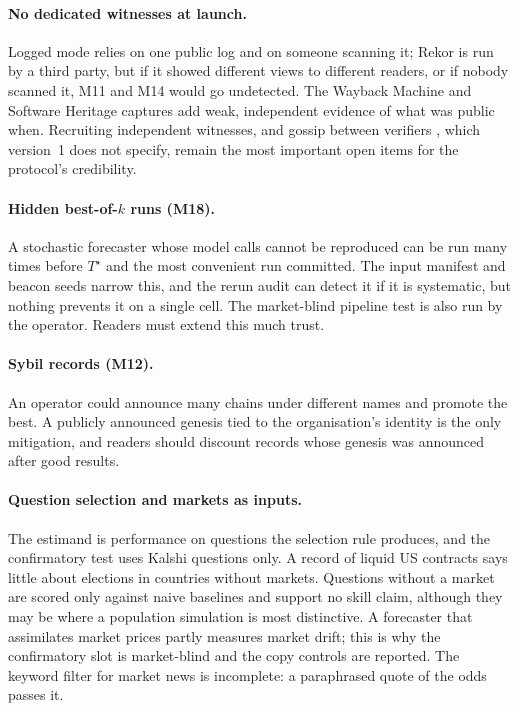 \documentclass[11pt]{article}
\newcommand{\Ts}{T^{\star}}
\begin{document}
\paragraph{No dedicated witnesses at launch.} Logged mode relies on one public log and on someone scanning it; Rekor is run by a third party, but if it showed different views to different readers, or if nobody scanned it, M11 and M14 would go undetected. The Wayback Machine and Software Heritage captures add weak, independent evidence of what was public when. Recruiting independent witnesses, and gossip between verifiers \citep{chuat2015gossip}, which version~1 does not specify, remain the most important open items for the protocol's credibility.

\paragraph{Hidden best-of-$k$ runs (M18).} A stochastic forecaster whose model calls cannot be reproduced can be run many times before $\Ts$ and the most convenient run committed. The input manifest and beacon seeds narrow this, and the rerun audit can detect it if it is systematic, but nothing prevents it on a single cell. The market-blind pipeline test is also run by the operator. Readers must extend this much trust.

\paragraph{Sybil records (M12).} An operator could announce many chains under different names and promote the best. A publicly announced genesis tied to the organisation's identity is the only mitigation, and readers should discount records whose genesis was announced after good results.

\paragraph{Question selection and markets as inputs.} The estimand is performance on questions the selection rule produces, and the confirmatory test uses Kalshi questions only. A record of liquid US contracts says little about elections in countries without markets. Questions without a market are scored only against naive baselines and support no skill claim, although they may be where a population simulation is most distinctive. A forecaster that assimilates market prices partly measures market drift; this is why the confirmatory slot is market-blind and the copy controls are reported. The keyword filter for market news is incomplete: a paraphrased quote of the odds passes it.
\end{document}
